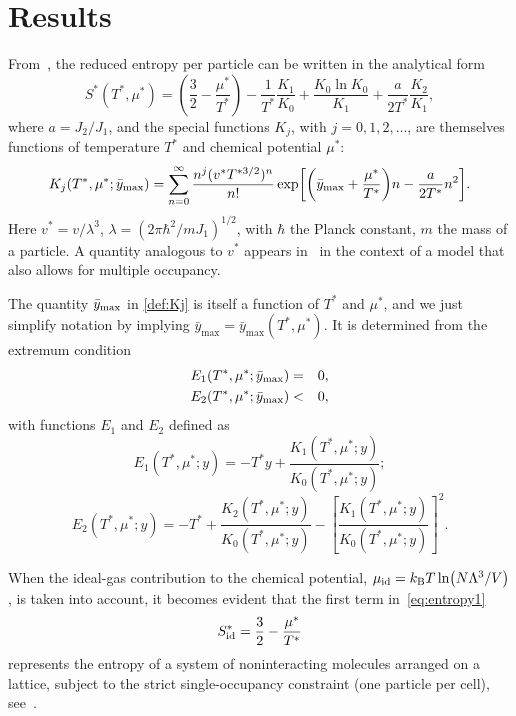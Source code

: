 \documentclass[entropy,article,submit,pdftex,moreauthors]{Definitions/mdpi}
\begin{document}
\section{Results}\label{sec:res}
From~\citep{RDKPS25arxiv}, the reduced entropy per particle can be written in the analytical form
\begin{equation}
	\label{eq:entropy1}
	S^*(T^*,\mu^*) = \left(\frac{3}{2} - \frac{\mu^*}{T^*}\right) - \frac{1}{T^*}\frac{K_1}{K_0} + \frac{K_0 \ln K_0}{K_1} + \frac{a}{2T^*} \frac{K_2}{K_1},
\end{equation}
where $a = J_2/J_1$, and the special functions $K_j$, with $j=0, 1, 2, \ldots$, are themselves functions of temperature $T^*$ and chemical potential $\mu^*$:
\begin{equation}
	\label{def:Kj}
	K_j(T^*,\mu^*;\bar{y}_{\rm max}) = \sum_{n=0}^{\infty} \frac{n^j (v^* T^{*3/2})^n}{n!} \exp[\left(\bar{y}_{\rm max}+\frac{\mu^*}{T^*}\right)n - \frac{a}{2T^*}n^2].
\end{equation}
Here $v^* = v/\lambda^3$, $\lambda = (2\pi\hbar^2/mJ_1)^{1/2}$, with $\hbar$ the Planck constant, $m$ the mass of a particle. A quantity analogous to $v^*$ appears in~\citep{PGT15} in the context of a model that also allows for multiple occupancy.

The quantity $\bar{y}_{\rm max}$ in \eqref{def:Kj} is itself a function of $T^*$ and $\mu^*$, and we just simplify notation by implying $\bar{y}_{\mathrm{max}} = \bar{y}_{\mathrm{max}}(T^*,\mu^*)$. It is determined from the extremum condition
\begin{eqnarray}
	\label{cond:max}
	E_1(T^*,\mu^*; \bar{y}_{\rm max}) & = & 0,
	\nonumber\\
	E_2(T^*,\mu^*;\bar{y}_{\rm max}) & < & 0,
\end{eqnarray}
with functions $E_1$ and $E_2$ defined as
\begin{equation}
	\label{def:E1}
	E_1(T^*,\mu^*;y) = -T^* y + \frac{K_1(T^*,\mu^*;y)}{K_0(T^*,\mu^*;y)};
\end{equation}
\begin{equation}
	E_2(T^*,\mu^*;y) = -T^*+\frac{K_2(T^*,\mu^*;y)}{K_0(T^*,\mu^*;y)}
	-\left[\frac{K_1(T^*,\mu^*;y)}{K_0(T^*,\mu^*;y)}\right]^2\!.
\end{equation}

When the ideal-gas contribution to the chemical potential, $\mu_{\rm{id}} = k_{\rm{B}}T \ln(N\Lambda^3/V)$, is taken into account, it becomes evident that the first term in~\eqref{eq:entropy1} 
\begin{equation}
	S^*_{\rm id} = \frac{3}{2} - \frac{\mu^*}{T^*}
\end{equation}
represents the entropy of a system of noninteracting molecules arranged on a lattice, subject to the strict single-occupancy constraint (one particle per cell), see~\citep[(47.4)]{Hill56}.
\end{document}
